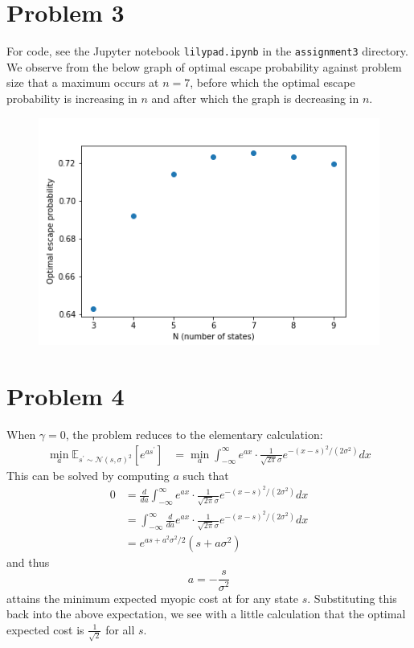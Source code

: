 \documentclass{article}
\begin{document}
\section*{Problem 3}

For code, see the Jupyter notebook \texttt{lilypad.ipynb} in the \texttt{assignment3} directory. We observe from the below graph of optimal escape probability against problem size that a maximum occurs at $n=7$, before which the optimal escape probability is increasing in $n$ and after which the graph is decreasing in $n$.

\begin{figure}[h!]
    \centering\includegraphics[width=0.8\linewidth]{opt_esc_prob.png}
\end{figure}

\section*{Problem 4}

When $\gamma=0$, the problem reduces to the elementary calculation:
\begin{align}
    \min_a \mathbb{E}_{s^\prime \sim \mathcal{N}(s,\sigma)^2} [e^{as^\prime}] &= \min_a \int_{-\infty}^{\infty} e^{ax} \cdot \frac{1}{\sqrt{2\pi}\sigma} e^{-(x-s)^2 / (2\sigma^2)} dx
\end{align}
This can be solved by computing $a$ such that
\begin{align}
    0 &= \frac{d}{da} \int_{-\infty}^{\infty} e^{ax} \cdot \frac{1}{\sqrt{2\pi}\sigma} e^{-(x-s)^2 / (2\sigma^2)} dx\\
      &= \int_{-\infty}^{\infty} \frac{d}{da} e^{ax} \cdot \frac{1}{\sqrt{2\pi}\sigma} e^{-(x-s)^2 / (2\sigma^2)} dx\\
      &= e^{as + a^2 \sigma^2 /2}(s+a\sigma^2)
\end{align}
and thus
\begin{equation}
    a = -\frac{s}{\sigma^2} 
\end{equation}
attains the minimum expected myopic cost at for any state $s$. Substituting this back into the above expectation, we see with a little calculation that the optimal expected cost is $\frac{1}{\sqrt{2}}$ for all $s$.
\end{document}
